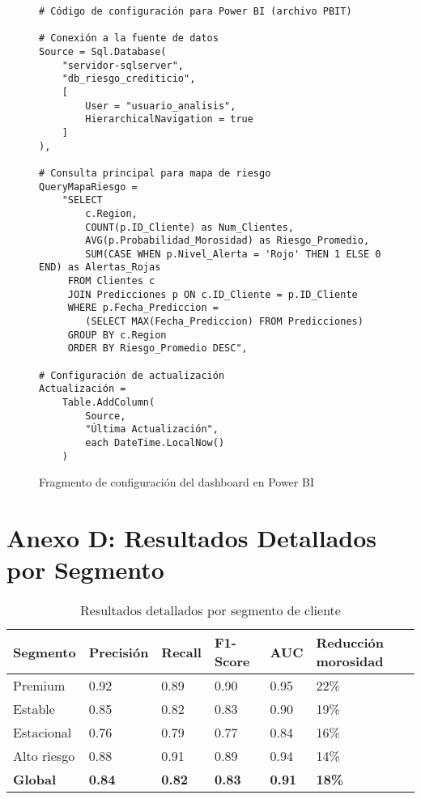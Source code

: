 \begin{figure}[ht]
\begin{verbatim}
# Código de configuración para Power BI (archivo PBIT)

# Conexión a la fuente de datos
Source = Sql.Database(
    "servidor-sqlserver", 
    "db_riesgo_crediticio",
    [
        User = "usuario_analisis",
        HierarchicalNavigation = true
    ]
),

# Consulta principal para mapa de riesgo
QueryMapaRiesgo = 
    "SELECT 
        c.Region, 
        COUNT(p.ID_Cliente) as Num_Clientes,
        AVG(p.Probabilidad_Morosidad) as Riesgo_Promedio,
        SUM(CASE WHEN p.Nivel_Alerta = 'Rojo' THEN 1 ELSE 0 END) as Alertas_Rojas
     FROM Clientes c
     JOIN Predicciones p ON c.ID_Cliente = p.ID_Cliente
     WHERE p.Fecha_Prediccion = 
        (SELECT MAX(Fecha_Prediccion) FROM Predicciones)
     GROUP BY c.Region
     ORDER BY Riesgo_Promedio DESC",
     
# Configuración de actualización
Actualización = 
    Table.AddColumn(
        Source, 
        "Última Actualización", 
        each DateTime.LocalNow()
    )
\end{verbatim}
\caption{Fragmento de configuración del dashboard en Power BI}
\end{figure}

\section{Anexo D: Resultados Detallados por Segmento}

\begin{table}[ht]
\centering
\begin{tabular}{|p{2.5cm}|p{2cm}|p{2cm}|p{2cm}|p{2cm}|p{2cm}|}
\hline
\textbf{Segmento} & \textbf{Precisión} & \textbf{Recall} & \textbf{F1-Score} & \textbf{AUC} & \textbf{Reducción morosidad} \\
\hline
Premium & 0.92 & 0.89 & 0.90 & 0.95 & 22\% \\
\hline
Estable & 0.85 & 0.82 & 0.83 & 0.90 & 19\% \\
\hline
Estacional & 0.76 & 0.79 & 0.77 & 0.84 & 16\% \\
\hline
Alto riesgo & 0.88 & 0.91 & 0.89 & 0.94 & 14\% \\
\hline
\textbf{Global} & \textbf{0.84} & \textbf{0.82} & \textbf{0.83} & \textbf{0.91} & \textbf{18\%} \\
\hline
\end{tabular}
\caption{Resultados detallados por segmento de cliente}
\end{table}

